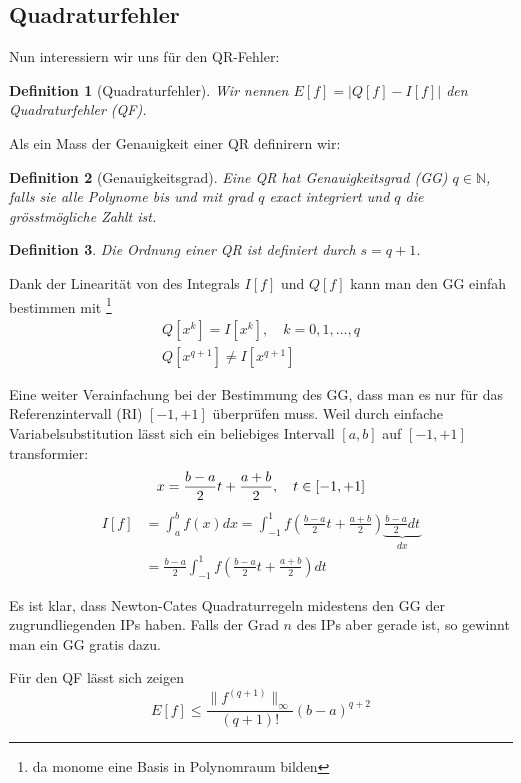 \documentclass[a4paper]{article}
\newtheorem{defn}{Definition}
\begin{document}
\subsection{Quadraturfehler}

Nun interessiern wir uns für den QR-Fehler:
\begin{defn}[Quadraturfehler]
  Wir nennen $E[f] = |Q[f] - I[f]|$ den Quadraturfehler (QF).
\end{defn}

Als ein Mass der Genauigkeit einer QR definirern wir:

\begin{defn}[Genauigkeitsgrad]
  Eine QR hat Genauigkeitsgrad (GG) $q \in \mathbb{N}$, falls sie alle Polynome
  bis und mit grad $q$ exact integriert und $q$ die grösstmögliche Zahlt ist.
\end{defn}

\begin{defn}
  Die Ordnung einer QR ist definiert durch $s = q + 1$.
\end{defn}

Dank der Linearität von des Integrals $I[f]$ und $Q[f]$ kann man den GG einfah
bestimmen mit \footnote{da monome eine Basis in Polynomraum bilden}
\begin{gather*}
  Q[x^k] = I[x^k], \quad k = 0,1,\ldots,q \\
  Q[x^{q + 1}] \neq I[x^{q + 1}]
\end{gather*}

Eine weiter Verainfachung bei der Bestimmung des GG, dass man es nur für das
Referenzintervall (RI) $[-1, +1]$ überprüfen muss. Weil durch einfache
Variabelsubstitution lässt sich ein beliebiges Intervall $[a,b]$ auf $[-1,+1]$
transformier:
\[
  x = \frac{b-a}{2} t + \frac{a+b}{2}, \quad t \in [-1, +1] \\
\]
\begin{align*}
  I[f] &= \int_a^b f(x) dx = \int_{-1}^1 f\left(
      \frac{b-a}{2} t + \frac{a+b}{2}
    \right) \underbrace{\frac{b-a}{2} dt}_{dx} \\
  &= \frac{b-a}{2} \int_{-1}^1 f\left(
      \frac{b-a}{2} t + \frac{a+b}{2}
    \right) dt
\end{align*}

Es ist klar, dass Newton-Cates Quadraturregeln midestens den GG der
zugrundliegenden IPs haben. Falls der Grad $n$ des IPs aber gerade ist, so
gewinnt man ein GG gratis dazu.

Für den QF lässt sich zeigen
\[
  E[f] \leq \frac{\| f^{(q+1)} \|_\infty}{(q+1)!} (b-a)^{q+2}
\]
\end{document}
